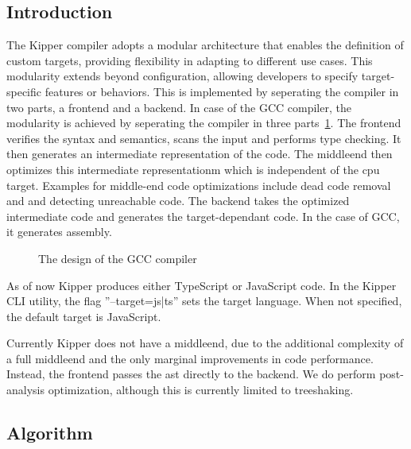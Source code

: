 \subsection{Introduction}
The Kipper compiler adopts a modular architecture that enables the definition of custom targets, providing flexibility in adapting to different use cases. This modularity extends beyond configuration, allowing developers to specify target-specific features or behaviors. This is implemented by seperating the compiler in two parts, a frontend and a backend. In case of the GCC compiler, the modularity is achieved by seperating the compiler in three parts~\ref{fig:implementation:gcccompiler}. The frontend verifies the syntax and semantics, scans the input and performs type checking. It then generates an intermediate representation of the code. The middleend then optimizes this intermediate representationm which is independent of the cpu target. Examples for middle-end code optimizations include dead code removal and and detecting unreachable code. The backend takes the optimized intermediate code and generates the target-dependant code. In the case of GCC, it generates assembly.

\begin{figure}[h!]
	\centering
	\def\stackalignment{r}
	\caption{The design of the GCC compiler}
	\label{fig:implementation:gcccompiler}
\end{figure}

As of now Kipper produces either TypeScript or JavaScript code. In the Kipper CLI utility, the flag ''--target={js|ts}'' sets the target language. When not specified, the default target is JavaScript.

Currently Kipper does not have a middleend, due to the additional complexity of a full middleend and the only marginal improvements in code performance. Instead, the frontend passes the \acrshort{ast} directly to the backend. We do perform post-analysis optimization, although this is currently limited to treeshaking.

\subsection{Algorithm}

